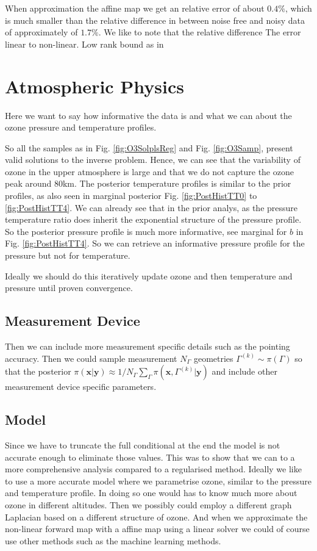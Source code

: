 When approximation the affine map we get an relative error of about $0.4\%$, which is much smaller than the relative difference in between noise free and noisy data of approximately of $1.7 \%$.
We like to note that the relative difference 
The error linear to non-linear.
Low rank bound as in \cite{Rohrbach2022tterror}

\section{Atmospheric Physics}
Here we want to say how informative the data is and what we can about the ozone pressure and temperature profiles.

So all the samples as in Fig. \ref{fig:O3SolplsReg} and Fig. \ref{fig:O3Samp}, present valid solutions to the inverse problem.
Hence, we can see that the variability of ozone in the upper atmosphere is large and that we do not capture the ozone peak around $80$km.
The posterior temperature profiles is similar to the prior profiles, as also seen in marginal posterior Fig. \ref{fig:PostHistTT0} to \ref{fig:PostHistTT4}.
We can already see that in the prior analys, as the pressure temperature ratio does inherit the exponential structure of the pressure profile.
So the posterior pressure profile is much more informative, see marginal for $b$ in Fig. \ref{fig:PostHistTT4}. 
So we can retrieve an informative pressure profile for the pressure but not for temperature.

Ideally we should do this iteratively update ozone and then temperature and pressure until proven convergence.


\subsection{Measurement Device}
Then we can include more measurement specific details such as the pointing accuracy.
Then we could sample measurement $N_{\Gamma}$ geometries $\Gamma^{(k)}\sim \pi(\Gamma)$ so that the posterior $\pi(\bm{x}|\bm{y}) \approx 1/N_{\Gamma} \sum_{\Gamma} \pi(\bm{x}, \Gamma^{(k)}|\bm{y})$ and include other measurement device specific parameters.


\subsection{Model}
Since we have to truncate the full conditional at the end the model is not accurate enough to eliminate those values.
This was to show that we can to a more comprehensive analysis compared to a regularised method.
Ideally we like to use a more accurate model where we parametrise ozone, similar to the pressure and temperature profile.
In doing so one would has to know much more about ozone in different altitudes.
Then we possibly could employ a different graph Laplacian based on a different structure of ozone.
And when we approximate the non-linear forward map with a affine map using a linear solver we could of course use other methods such as the machine learning methods.


